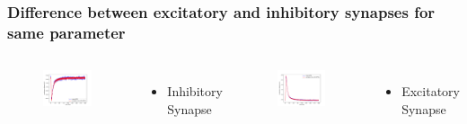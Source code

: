 \documentclass{beamer}
\begin{document}
\begin{frame}

	\frametitle{Difference between excitatory and inhibitory synapses for same parameter}
	 \begin{columns}
          	\begin{figure}
    				\centering
    				\includegraphics[width=\linewidth]{figures/epsp_inh_fall_03_out_05.pdf}
 		   \end{figure}
 		   \begin{itemize}
          		\item Inhibitory Synapse
          	\end{itemize}

          \begin{figure}
    				\centering
    				\includegraphics[width=\linewidth]{figures/epsp_exc_fall_03_out_05.pdf}
 		   \end{figure}
 		   \begin{itemize}
          		\item Excitatory Synapse
          	\end{itemize}


\end{columns}
\end{frame}
\end{document}
